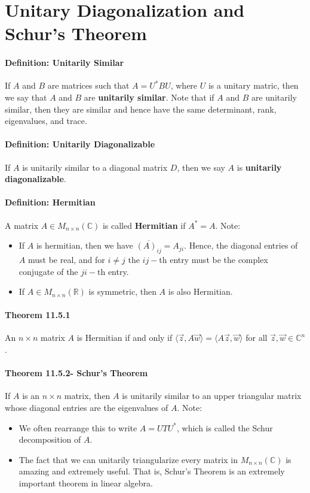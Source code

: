 \documentclass[10pt,letter]{article}
\begin{document}
\section*{Unitary Diagonalization and Schur's Theorem}
\paragraph{Definition: Unitarily Similar}
If $A$ and $B$ are matrices such that $A=U^*BU$, where $U$ is a unitary matric, then we say that $A$ and $B$ are \textbf{unitarily similar}. Note that if $A$ and $B$ are unitarily similar, then they are similar and hence have the same determinant, rank, eigenvalues, and trace. 
\paragraph{Definition: Unitarily Diagonalizable}
If $A$ is unitarily similar to a diagonal matrix $D$, then we say $A$ is \textbf{unitarily diagonalizable}. 
\paragraph{Definition: Hermitian}
A matrix $A\in M_{n\times n}(\mathbb{C})$ is called \textbf{Hermitian} if $A^*=A$. Note: 
\begin{itemize}
    \item If $A$ is hermitian, then we have $\overline{(A)_{ij}}=A_{ji}$. Hence, the diagonal entries of $A$ must be real, and for $i\neq j$ the $ij-$th entry must be the complex conjugate of the $ji-$th entry. 
    \item If $A\in M_{n\times n}(\mathbb{R})$ is symmetric, then $A$ is also Hermitian. 
\end{itemize}
\paragraph{Theorem 11.5.1}
An $n\times n$ matrix $A$ is Hermitian if and only if $\langle \vec{z}, A\vec{w}\rangle = \langle A\vec{z},\vec{w}\rangle$ for all $\vec{z},\vec{w}\in\mathbb{C}^n$. 
\paragraph{Theorem 11.5.2- Schur's Theorem}
If $A$ is an $n\times n$ matrix, then $A$ is unitarily similar to an upper triangular matrix whose diagonal entries are the eigenvalues of $A$. Note:
\begin{itemize}
    \item We often rearrange this to write $A=UTU^*$, which is called the Schur decomposition of $A$. 
    \item The fact that we can unitarily triangularize every matrix in $M_{n\times n}(\mathbb{C})$ is amazing and extremely useful. That is, Schur's Theorem is an extremely important theorem in linear algebra. 
\end{itemize}
\end{document}

